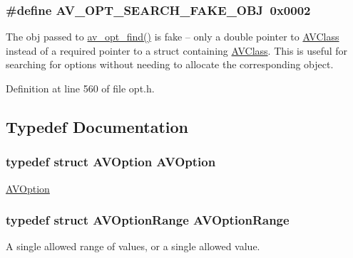 \subsubsection[{\texorpdfstring{A\+V\+\_\+\+O\+P\+T\+\_\+\+S\+E\+A\+R\+C\+H\+\_\+\+F\+A\+K\+E\+\_\+\+O\+BJ}{AV_OPT_SEARCH_FAKE_OBJ}}]{\setlength{\rightskip}{0pt plus 5cm}\#define A\+V\+\_\+\+O\+P\+T\+\_\+\+S\+E\+A\+R\+C\+H\+\_\+\+F\+A\+K\+E\+\_\+\+O\+BJ~0x0002}\hypertarget{group__avoptions_gaa764998552a6f6f66a47ecd52b345caa}{}\label{group__avoptions_gaa764998552a6f6f66a47ecd52b345caa}
The obj passed to \hyperlink{group__avoptions_gae31ae7fb20113b00108d0ecf53f25664}{av\+\_\+opt\+\_\+find()} is fake -- only a double pointer to \hyperlink{struct_a_v_class}{A\+V\+Class} instead of a required pointer to a struct containing \hyperlink{struct_a_v_class}{A\+V\+Class}. This is useful for searching for options without needing to allocate the corresponding object. 

Definition at line 560 of file opt.\+h.



\subsection{Typedef Documentation}
\subsubsection[{\texorpdfstring{A\+V\+Option}{AVOption}}]{\setlength{\rightskip}{0pt plus 5cm}typedef struct {\bf A\+V\+Option}  {\bf A\+V\+Option}}\hypertarget{group__avoptions_gaa1b952fe722d2259743ba5a35ce47f46}{}\label{group__avoptions_gaa1b952fe722d2259743ba5a35ce47f46}
\hyperlink{struct_a_v_option}{A\+V\+Option} 
\subsubsection[{\texorpdfstring{A\+V\+Option\+Range}{AVOptionRange}}]{\setlength{\rightskip}{0pt plus 5cm}typedef struct {\bf A\+V\+Option\+Range}  {\bf A\+V\+Option\+Range}}\hypertarget{group__avoptions_gac8caf68f1d182f6a081ff4336efbeac6}{}\label{group__avoptions_gac8caf68f1d182f6a081ff4336efbeac6}
A single allowed range of values, or a single allowed value. 
